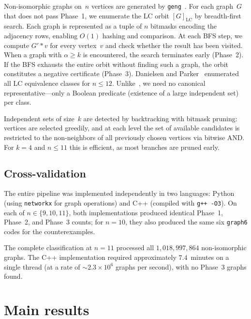 \documentclass[11pt]{amsart}
\theoremstyle{definition}
\theoremstyle{remark}
\newcommand{\LC}{\mathrm{LC}}
\begin{document}
Non-isomorphic graphs on~$n$ vertices are generated by
\texttt{geng}~\cite{McKayPiperno2014}.  For each graph~$G$ that does
not pass Phase~1, we enumerate the LC orbit $[G]_{\LC}$ by
breadth-first search.  Each graph is represented as a tuple of $n$
bitmasks encoding the adjacency rows, enabling $O(1)$ hashing and
comparison.  At each BFS step, we compute $G'*v$ for every vertex~$v$
and check whether the result has been visited.  When a graph with
$\alpha\geq k$ is encountered, the search terminates early (Phase~2).
If the BFS exhausts the entire orbit without finding such a graph, the
orbit constitutes a negative certificate (Phase~3).  Danielsen and
Parker~\cite{DanielsenParker2006} enumerated all LC equivalence classes
for $n\leq 12$.  Unlike~\cite{DanielsenParker2006}, we need no canonical
representative---only a Boolean predicate (existence of a large
independent set) per class.

Independent sets of size~$k$ are detected by backtracking with
bitmask pruning: vertices are selected greedily, and at each level the
set of available candidates is restricted to the non-neighbors of all
previously chosen vertices via bitwise AND\@.  For $k=4$ and $n\leq 11$
this is efficient, as most branches are pruned early.

\subsection{Cross-validation}\label{subsec:cross}

The entire pipeline was implemented independently in two languages:
Python (using \texttt{networkx} for graph operations) and C++ (compiled
with \texttt{g++ -O3}).  On each of $n\in\{9,10,11\}$, both
implementations produced identical Phase~1, Phase~2, and Phase~3
counts; for $n=10$, they also produced the same six
\texttt{graph6} codes for the counterexamples.

The complete classification at $n=11$ processed all
$1{,}018{,}997{,}864$ non-isomorphic graphs.  The C++ implementation
required approximately $7.4$~minutes on a single thread (at a rate of
${\sim}2.3\times 10^6$ graphs per second), with no Phase~3 graphs
found.


\section{Main results}\label{sec:results}
\end{document}
